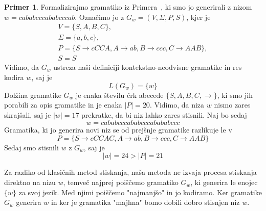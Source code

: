 \documentclass{amsart}
\theoremstyle{definition} %
\newtheorem{primer}[definicija]{Primer}
\theoremstyle{plain} %
\begin{document}
\begin{primer}
    
    Formalizirajmo gramatiko iz Primera~, ki smo jo generirali z nizom
    $ w = cababcccababcccab $. Označimo jo z $ G_w = ( V, \Sigma, P, S ) $, kjer je 
    \begin{gather*}
        V = \{ S, A, B, C \}, \\
        \Sigma = \{ a, b, c \}, \\
        P = \{ S  \rightarrow  cCCA, A  \rightarrow  ab, B  
        \rightarrow  ccc, C  \rightarrow  AAB \}, \\
        S = S
    \end{gather*}
    Vidimo, da $ G_w $ ustreza naši definiciji kontekstno-neodvisne gramatike
    in res kodira $ w $, saj je 
    \[
        L(G_w) = \{w\}
    \]
    Dolžina gramatike $ G_w $ je enaka številu črk abecede $ \{ S, A, B, C, \rightarrow \} $,
    ki smo jih porabili za opis gramatike in je enaka $ |P| = 20 $. Vidimo, da niza $ w $ 
    nismo zares skrajšali, saj je $ |w| = 17 $ prekratke, da bi niz lahko zares stisnili.
    Naj bo sedaj
    \[
        w =   cababcccababcccabababccc
    \]
    Gramatika, ki jo generira novi niz se od prejšnje gramatike razlikuje le v
    \[
        P = \{ S  \rightarrow  cCCAC, A  \rightarrow  ab, B  
        \rightarrow  ccc, C  \rightarrow  AAB \}  
    \]
    Sedaj smo stisnili $ w $ z $ G_w $, saj je
    \[
        |w| = 24 > |P| = 21
    \]

\end{primer}

Za razliko od klasičnih metod stiskanja, naša metoda ne izvaja procesa stiskanja
direktno na nizu $ w $, temveč najprej poiščemo gramatiko $ G_w $, ki generira 
le enojec $ \{ w \} $ za svoj jezik. Med njimi poiščemo "najmanjšo" in jo kodiramo.
Ker gramatike $ G_w $ generira $ w $ in ker je gramatika "majhna" bomo dobili
dobro stisnjen niz $ w $.
\end{document}
